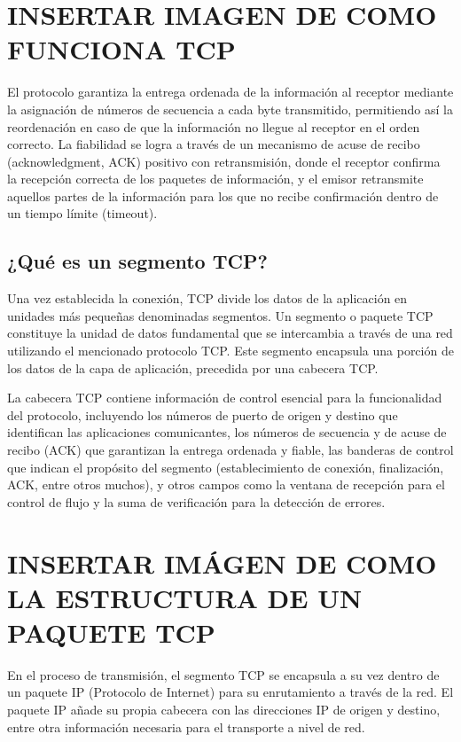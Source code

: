 \section{INSERTAR IMAGEN DE COMO FUNCIONA TCP}

El protocolo garantiza la entrega ordenada de la información al receptor mediante la asignación de números de secuencia a cada byte transmitido, permitiendo así la reordenación en caso de que la información no llegue al receptor en el orden correcto. La fiabilidad se logra a través de un mecanismo de acuse de recibo (acknowledgment, ACK) positivo con retransmisión, donde el receptor confirma la recepción correcta de los paquetes de información, y el emisor retransmite aquellos partes de la información para los que no recibe confirmación dentro de un tiempo límite (timeout).

\subsection{¿Qué es un segmento TCP?}
Una vez establecida la conexión, TCP divide los datos de la aplicación en unidades más pequeñas denominadas segmentos. Un segmento o paquete TCP constituye la unidad de datos fundamental que se intercambia a través de una red utilizando el mencionado protocolo TCP. Este segmento encapsula una porción de los datos de la capa de aplicación, precedida por una cabecera TCP. 

La cabecera TCP contiene información de control esencial para la funcionalidad del protocolo, incluyendo los números de puerto de origen y destino que identifican las aplicaciones comunicantes, los números de secuencia y de acuse de recibo (ACK) que garantizan la entrega ordenada y fiable, las banderas de control que indican el propósito del segmento (establecimiento de conexión, finalización, ACK, entre otros muchos), y otros campos como la ventana de recepción para el control de flujo y la suma de verificación para la detección de errores.


\section{INSERTAR IMÁGEN DE COMO LA ESTRUCTURA DE UN PAQUETE TCP}

En el proceso de transmisión, el segmento TCP se encapsula a su vez dentro de un paquete IP (Protocolo de Internet) para su enrutamiento a través de la red. El paquete IP añade su propia cabecera con las direcciones IP de origen y destino, entre otra información necesaria para el transporte a nivel de red. 

